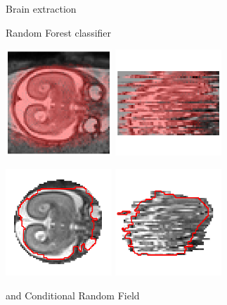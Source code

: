 \documentclass[12pt]{beamer}
\begin{document}
\begin{frame}{Brain extraction}

\centering

Random Forest classifier

\vspace{0.01\textheight}

 \includegraphics[width=0.3\textwidth]{3599_5_probaXY.png}
 \includegraphics[width=0.3\textwidth]{3599_5_probaXZ.png}

 \includegraphics[width=0.3\textwidth, clip=true, trim=0 60 0 51]{3599_5_maskedXY.png}
 \includegraphics[width=0.3\textwidth, clip=true, trim=0 60 0 51]{3599_5_maskedXZ.png}

 and Conditional Random Field

\end{frame}
\end{document}
